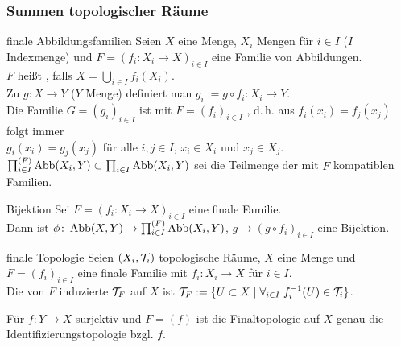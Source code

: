 \pagebreak

\subsubsection{%
    Summen topologischer Räume%
}

\begin{Def}{finale Abbildungsfamilien}
    Seien $X$ eine Menge, $X_i$ Mengen für $i \in I$ ($I$ Indexmenge)
    und $F = (f_i\colon X_i \rightarrow X)_{i \in I}$ eine Familie von
    Abbildungen. \\
    $F$ heißt , falls
    $X = \bigcup_{i \in I} f_i(X_i)$. \\
    Zu $g\colon X \rightarrow Y$ ($Y$ Menge) definiert man
    $g_i := g \circ f_i\colon X_i \rightarrow Y$. \\
    Die Familie $G = (g_i)_{i \in I}$ ist mit $F = (f_i)_{i \in I}$
    , d.\,h. aus $f_i(x_i) = f_j(x_j)$ folgt immer \\
    $g_i(x_i) = g_j(x_j)$ für alle $i, j \in I$, $x_i \in X_i$
    und $x_j \in X_j$. \\
    $\prod_{i \in I}^{(F)} \operatorname{Abb}(X_i, Y) \subset \prod_{i \in I} \operatorname{Abb}(X_i, Y)$
    sei die Teilmenge der mit $F$ kompatiblen Familien.
\end{Def}

\begin{Satz}{Bijektion}
    Sei $F = (f_i\colon X_i \rightarrow X)_{i \in I}$ eine finale Familie. \\
    Dann ist
    $\phi\colon \operatorname{Abb}(X, Y) \rightarrow \prod_{i \in I}^{(F)} \operatorname{Abb}(X_i, Y)$,
    $g \mapsto (g \circ f_i)_{i \in I}$ eine Bijektion.
\end{Satz}

\linie

\begin{Def}{finale Topologie}
    Seien $(X_i, \mathcal{T}_i)$ topologische Räume, $X$ eine Menge und
    $F = (f_i)_{i \in I}$ eine finale Familie mit
    $f_i\colon X_i \rightarrow X$ für $i \in I$. \\
    Die von $F$ induzierte  $\mathcal{T}_F$ auf $X$ ist
    $\mathcal{T}_F := \{U \subset X \;|\; \forall_{i \in I}\; f_i^{-1}(U) \in \mathcal{T}_i\}$.
\end{Def}

\begin{Bsp}
    Für $f\colon Y \rightarrow X$ surjektiv und $F = (f)$
    ist die Finaltopologie auf $X$
    genau die Identifizierungstopologie bzgl. $f$.
\end{Bsp}

